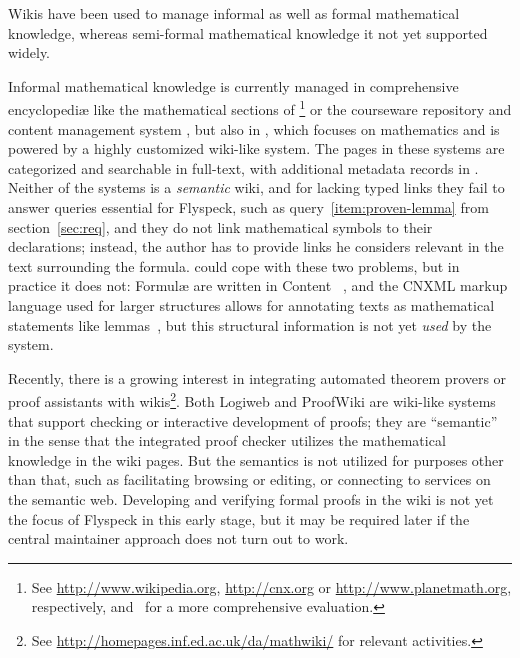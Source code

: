 Wikis have been used to manage informal as well as formal mathematical knowledge, whereas
semi-formal mathematical knowledge it not yet supported widely.

Informal mathematical knowledge is currently managed in comprehensive encyclopediæ like
the mathematical sections of \footnote{See
  \url{http://www.wikipedia.org}, \url{http://cnx.org} or \url{http://www.planetmath.org},
  respectively, and~\cite{Lange:swmkm-tr07} for a more comprehensive evaluation.} or the
courseware repository and content management system
\footnotemark[\value{footnote}], but also in
\footnotemark[\value{footnote}], which focuses on mathematics and is
powered by a highly customized wiki-like system.  The pages in these systems are
categorized and searchable in full-text, with additional metadata records in
.  Neither of the systems is a \emph{semantic} wiki, and for lacking
typed links they fail to answer queries essential for Flyspeck, such as
query~\ref{item:proven-lemma} from section~\ref{sec:req}, and they do not link
mathematical symbols to their declarations; instead, the author has to provide links he
considers relevant in the text surrounding the formula.   could cope
with these two problems, but in practice it does not: Formulæ are written in Content
{\mathml}~\cite{CarlisleEd:MathML07}, and the CNXML markup language used for larger
structures allows for annotating texts as mathematical statements like
lemmas~\cite{connexions05:cnxml}, but this structural information is not yet \emph{used}
by the system.

Recently, there is a growing interest in integrating automated theorem provers or proof
assistants with wikis\footnote{See \url{http://homepages.inf.ed.ac.uk/da/mathwiki/} for
  relevant activities.}.  Both Logiweb and ProofWiki are wiki-like systems that support
checking or interactive development of proofs; they are ``semantic'' in the sense that the
integrated proof checker utilizes the mathematical knowledge in the wiki pages.  But the
semantics is not utilized for purposes other than that, such as facilitating browsing or
editing, or connecting to services on the semantic web.  Developing and verifying formal
proofs in the wiki is not yet the focus of Flyspeck in this early stage, but it may be
required later if the central maintainer approach does not turn out to
work.


